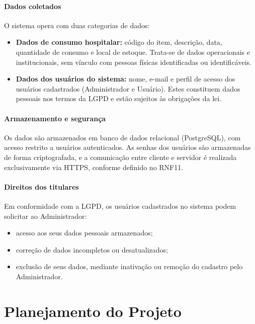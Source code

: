 \documentclass[12pt,a4paper]{article}
\begin{document}
\paragraph{Dados coletados}
O sistema opera com duas categorias de dados:

\begin{itemize}
    \item \textbf{Dados de consumo hospitalar:} código do item, descrição, 
    data, quantidade de consumo e local de estoque. Trata-se de dados 
    operacionais e institucionais, sem vínculo com pessoas físicas 
    identificadas ou identificáveis.

    \item \textbf{Dados dos usuários do sistema:} nome, e-mail e perfil de 
    acesso dos usuários cadastrados (Administrador e Usuário). Estes 
    constituem dados pessoais nos termos da LGPD e estão sujeitos às 
    obrigações da lei.
\end{itemize}

\paragraph{Armazenamento e segurança}
Os dados são armazenados em banco de dados relacional (PostgreSQL), com 
acesso restrito a usuários autenticados. As senhas dos usuários são 
armazenadas de forma criptografada, e a comunicação entre cliente e 
servidor é realizada exclusivamente via HTTPS, conforme definido no RNF11.

\paragraph{Direitos dos titulares}
Em conformidade com a LGPD, os usuários cadastrados no sistema podem 
solicitar ao Administrador:
\begin{itemize}
    \item acesso aos seus dados pessoais armazenados;
    \item correção de dados incompletos ou desatualizados;
    \item exclusão de seus dados, mediante inativação ou remoção do 
    cadastro pelo Administrador.
\end{itemize}

\section{Planejamento do Projeto}
\end{document}
